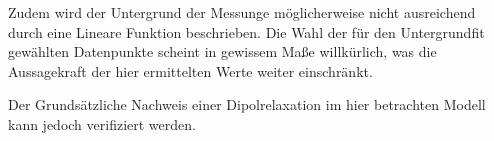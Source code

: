 Zudem wird der Untergrund der Messunge möglicherweise nicht ausreichend durch
eine Lineare Funktion beschrieben. Die Wahl der für den Untergrundfit gewählten
Datenpunkte scheint in gewissem Maße willkürlich, was die Aussagekraft der
hier ermittelten Werte weiter einschränkt.

Der Grundsätzliche Nachweis einer Dipolrelaxation im hier betrachten Modell
kann jedoch verifiziert werden.
